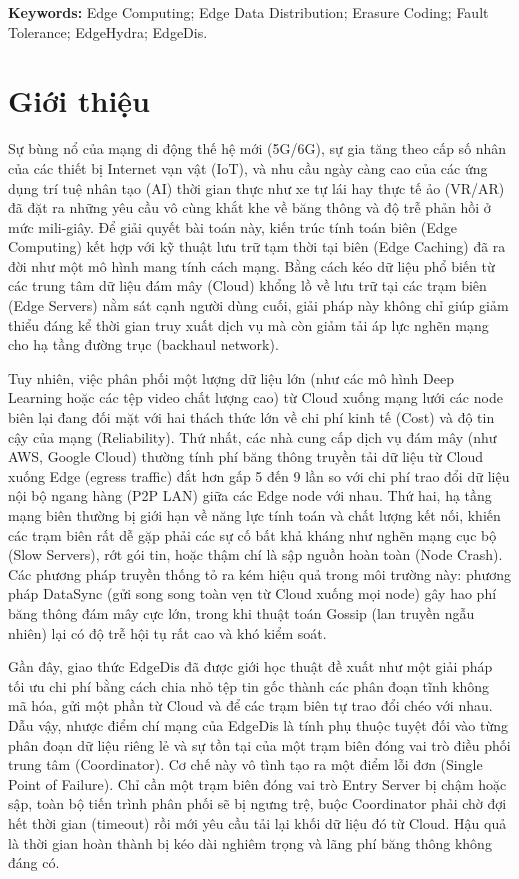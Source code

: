 \documentclass[11pt,a4paper]{article}
\begin{document}
\textbf{Keywords:} Edge Computing; Edge Data Distribution; Erasure Coding; Fault Tolerance; EdgeHydra; EdgeDis.


\section{Giới thiệu}

Sự bùng nổ của mạng di động thế hệ mới (5G/6G), sự gia tăng theo cấp số nhân của các thiết bị Internet vạn vật (IoT), và nhu cầu ngày càng cao của các ứng dụng trí tuệ nhân tạo (AI) thời gian thực như xe tự lái hay thực tế ảo (VR/AR) đã đặt ra những yêu cầu vô cùng khắt khe về băng thông và độ trễ phản hồi ở mức mili-giây. Để giải quyết bài toán này, kiến trúc tính toán biên (Edge Computing) kết hợp với kỹ thuật lưu trữ tạm thời tại biên (Edge Caching) đã ra đời như một mô hình mang tính cách mạng. Bằng cách kéo dữ liệu phổ biến từ các trung tâm dữ liệu đám mây (Cloud) khổng lồ về lưu trữ tại các trạm biên (Edge Servers) nằm sát cạnh người dùng cuối, giải pháp này không chỉ giúp giảm thiểu đáng kể thời gian truy xuất dịch vụ mà còn giảm tải áp lực nghẽn mạng cho hạ tầng đường trục (backhaul network).

Tuy nhiên, việc phân phối một lượng dữ liệu lớn (như các mô hình Deep Learning hoặc các tệp video chất lượng cao) từ Cloud xuống mạng lưới các node biên lại đang đối mặt với hai thách thức lớn về chi phí kinh tế (Cost) và độ tin cậy của mạng (Reliability). Thứ nhất, các nhà cung cấp dịch vụ đám mây (như AWS, Google Cloud) thường tính phí băng thông truyền tải dữ liệu từ Cloud xuống Edge (egress traffic) đắt hơn gấp 5 đến 9 lần so với chi phí trao đổi dữ liệu nội bộ ngang hàng (P2P LAN) giữa các Edge node với nhau. Thứ hai, hạ tầng mạng biên thường bị giới hạn về năng lực tính toán và chất lượng kết nối, khiến các trạm biên rất dễ gặp phải các sự cố bất khả kháng như nghẽn mạng cục bộ (Slow Servers), rớt gói tin, hoặc thậm chí là sập nguồn hoàn toàn (Node Crash). Các phương pháp truyền thống tỏ ra kém hiệu quả trong môi trường này: phương pháp DataSync (gửi song song toàn vẹn từ Cloud xuống mọi node) gây hao phí băng thông đám mây cực lớn, trong khi thuật toán Gossip (lan truyền ngẫu nhiên) lại có độ trễ hội tụ rất cao và khó kiểm soát.

Gần đây, giao thức EdgeDis đã được giới học thuật đề xuất như một giải pháp tối ưu chi phí bằng cách chia nhỏ tệp tin gốc thành các phân đoạn tĩnh không mã hóa, gửi một phần từ Cloud và để các trạm biên tự trao đổi chéo với nhau. Dẫu vậy, nhược điểm chí mạng của EdgeDis là tính phụ thuộc tuyệt đối vào từng phân đoạn dữ liệu riêng lẻ và sự tồn tại của một trạm biên đóng vai trò điều phối trung tâm (Coordinator). Cơ chế này vô tình tạo ra một điểm lỗi đơn (Single Point of Failure). Chỉ cần một trạm biên đóng vai trò Entry Server bị chậm hoặc sập, toàn bộ tiến trình phân phối sẽ bị ngưng trệ, buộc Coordinator phải chờ đợi hết thời gian (timeout) rồi mới yêu cầu tải lại khối dữ liệu đó từ Cloud. Hậu quả là thời gian hoàn thành bị kéo dài nghiêm trọng và lãng phí băng thông không đáng có.
\end{document}
